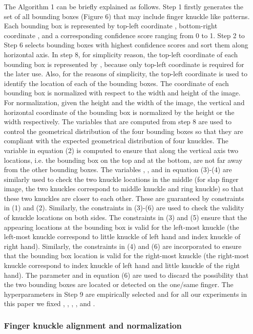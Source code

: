 The Algorithm 1 can be briefly explained as follows. Step 1 firstly generates the set of all bounding boxes  (Figure 6) that may include finger knuckle like patterns. Each bounding box  is represented by top-left coordinate , bottom-right coordinate , and a corresponding confidence score  ranging from 0 to 1. Step 2 to Step 6 selects bounding boxes with highest confidence scores and sort them along horizontal axis. In step 8, for simplicity reason, the top-left coordinate of each bounding box is represented by , because only top-left coordinate is required for the later use. Also, for the reasons of simplicity, the top-left coordinate is used to identify the location of each of the bounding boxes. The coordinate of each bounding box is normalized with respect to the width and height of the image. For normalization, given the height and the width of the image, the vertical and horizontal coordinate of the bounding box is normalized by the height or the width respectively. The variables that are computed from step 8 are used to control the geometrical distribution of the four bounding boxes so that they are compliant with the expected geometrical distribution of four knuckles. The variable  in equation (2) is computed to ensure that along the vertical axis two locations, i.e. the bounding box on the top and at the bottom, are not far away from the other bounding boxes. The variables , ,  and  in equation (3)-(4) are similarly used to check the two knuckle locations in the middle (for slap finger image, the two knuckles correspond to middle knuckle and ring knuckle) so that these two knuckles are closer to each other. These are guaranteed by constraints in (1) and (2). Similarly, the constraints in (3)-(6) are used to check the validity of knuckle locations on both sides. The constraints in (3) and (5) ensure that the appearing locations at the bounding box is valid for the left-most knuckle (the left-most knuckle correspond to little knuckle of left hand and index knuckle of right hand). Similarly, the constraints in (4) and (6) are incorporated to ensure that the bounding box location is valid for the right-most knuckle (the right-most knuckle correspond to index knuckle of left hand and little knuckle of the right hand). The parameter  and  in equation (6) are used to discard the possibility that the two bounding boxes are located or detected on the one/same finger. The hyperparameters in Step 9 are empirically selected and for all our experiments in this paper we fixed , , , , and .

\subsubsection{Finger knuckle alignment and normalization}

